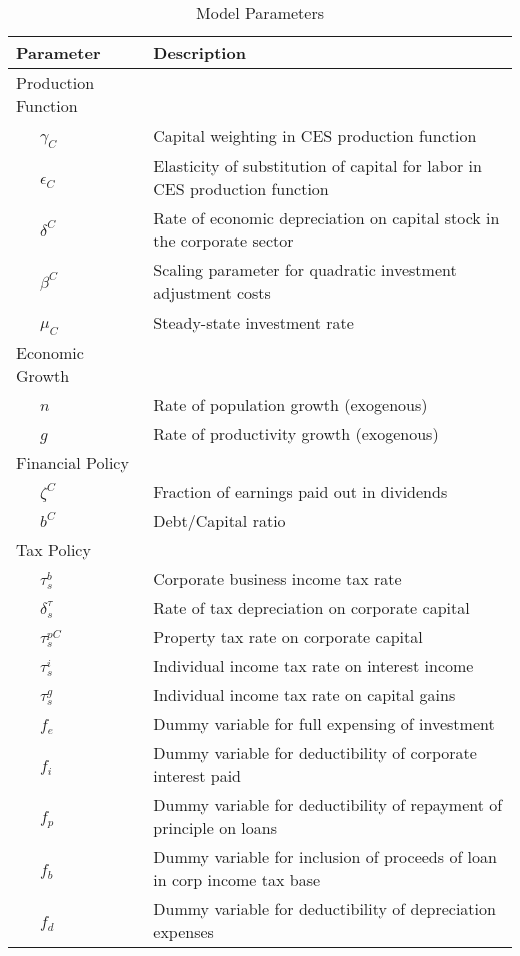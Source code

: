 \begin{table}[htbp]
  \centering
  \caption{Model Parameters}
    \begin{tabular}{ll}
    \hline
    \hline
    Parameter & Description \\
    \hline
    Production Function &  \\
    \ \ \ $\gamma_{C}$ & Capital weighting in CES production function \\
    \ \ \ $\epsilon_{C}$ & Elasticity of substitution of capital for labor in CES production function \\
    \ \ \ $\delta^{C}$ & Rate of economic depreciation on capital stock in the corporate sector \\
    \ \ \ $\beta^{C}$ & Scaling parameter for quadratic investment adjustment costs \\
    \ \ \ $\mu_{C}$ & Steady-state investment rate \\
    Economic Growth &  \\
    \ \ \ $n$ & Rate of population growth (exogenous) \\
    \ \ \ $g$ & Rate of productivity growth (exogenous) \\
    Financial Policy &  \\
    \ \ \ $\zeta^{C}$ & Fraction of earnings paid out in dividends \\
    \ \ \ $b^{C}$ & Debt/Capital ratio \\
    Tax Policy &  \\
    \ \ \ $\tau^{b}_{s}$ & Corporate business income tax rate \\
    \ \ \ $\delta^{\tau}_{s}$ & Rate of tax depreciation on corporate capital \\
    \ \ \ $\tau^{pC}_{s}$ & Property tax rate on corporate capital \\
    \ \ \ $\tau^{i}_{s}$ & Individual income tax rate on interest income \\
    \ \ \ $\tau^{g}_{s}$ & Individual income tax rate on capital gains \\
    \ \ \ $f_{e}$ & Dummy variable for full expensing of investment  \\
    \ \ \ $f_{i}$ & Dummy variable for deductibility of corporate interest paid \\
    \ \ \ $f_{p}$ & Dummy variable for deductibility of repayment of principle on loans \\
    \ \ \ $f_{b}$ & Dummy variable for inclusion of proceeds of loan in corp income tax base \\
    \ \ \ $f_{d}$ & Dummy variable for deductibility of depreciation expenses \\
    \hline
    \hline
    \end{tabular}%
  \label{tab:parameters}%
\end{table}%

